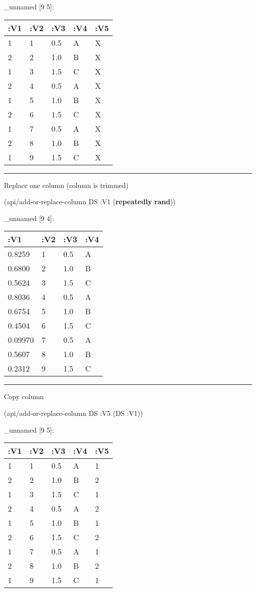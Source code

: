 \documentclass[]{article}
\newenvironment{Shaded}{\begin{snugshade}}{\end{snugshade}}
\newcommand{\AttributeTok}[1]{\textcolor[rgb]{0.77,0.63,0.00}{#1}}
\newcommand{\KeywordTok}[1]{\textcolor[rgb]{0.13,0.29,0.53}{\textbf{#1}}}
\newcommand{\NormalTok}[1]{#1}
\begin{document}
\_unnamed {[}9 5{]}:

\begin{longtable}[]{@{}lllll@{}}
\toprule
:V1 & :V2 & :V3 & :V4 & :V5\tabularnewline
\midrule
\endhead
1 & 1 & 0.5 & A & X\tabularnewline
2 & 2 & 1.0 & B & X\tabularnewline
1 & 3 & 1.5 & C & X\tabularnewline
2 & 4 & 0.5 & A & X\tabularnewline
1 & 5 & 1.0 & B & X\tabularnewline
2 & 6 & 1.5 & C & X\tabularnewline
1 & 7 & 0.5 & A & X\tabularnewline
2 & 8 & 1.0 & B & X\tabularnewline
1 & 9 & 1.5 & C & X\tabularnewline
\bottomrule
\end{longtable}

\begin{center}\rule{0.5\linewidth}{0.5pt}\end{center}

Replace one column (column is trimmed)

\begin{Shaded}
\begin{Highlighting}[]
\NormalTok{(api/add-or-replace-column DS }\AttributeTok{:V1}\NormalTok{ (}\KeywordTok{repeatedly} \KeywordTok{rand}\NormalTok{))}
\end{Highlighting}
\end{Shaded}

\_unnamed {[}9 4{]}:

\begin{longtable}[]{@{}llll@{}}
\toprule
:V1 & :V2 & :V3 & :V4\tabularnewline
\midrule
\endhead
0.8259 & 1 & 0.5 & A\tabularnewline
0.6800 & 2 & 1.0 & B\tabularnewline
0.5624 & 3 & 1.5 & C\tabularnewline
0.8036 & 4 & 0.5 & A\tabularnewline
0.6754 & 5 & 1.0 & B\tabularnewline
0.4504 & 6 & 1.5 & C\tabularnewline
0.09970 & 7 & 0.5 & A\tabularnewline
0.5607 & 8 & 1.0 & B\tabularnewline
0.2312 & 9 & 1.5 & C\tabularnewline
\bottomrule
\end{longtable}

\begin{center}\rule{0.5\linewidth}{0.5pt}\end{center}

Copy column

\begin{Shaded}
\begin{Highlighting}[]
\NormalTok{(api/add-or-replace-column DS }\AttributeTok{:V5}\NormalTok{ (DS }\AttributeTok{:V1}\NormalTok{))}
\end{Highlighting}
\end{Shaded}

\_unnamed {[}9 5{]}:

\begin{longtable}[]{@{}lllll@{}}
\toprule
:V1 & :V2 & :V3 & :V4 & :V5\tabularnewline
\midrule
\endhead
1 & 1 & 0.5 & A & 1\tabularnewline
2 & 2 & 1.0 & B & 2\tabularnewline
1 & 3 & 1.5 & C & 1\tabularnewline
2 & 4 & 0.5 & A & 2\tabularnewline
1 & 5 & 1.0 & B & 1\tabularnewline
2 & 6 & 1.5 & C & 2\tabularnewline
1 & 7 & 0.5 & A & 1\tabularnewline
2 & 8 & 1.0 & B & 2\tabularnewline
1 & 9 & 1.5 & C & 1\tabularnewline
\bottomrule
\end{longtable}
\end{document}
